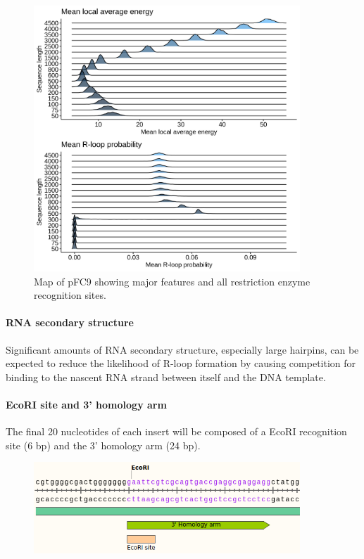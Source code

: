 \documentclass[11pt]{article}
\begin{document}
\begin{figure}[H]
	\includegraphics[width=10cm]{images/plots/rand_seq_LAE_dist.png}
	\centering
	\caption{Map of pFC9 showing major features and all restriction enzyme recognition sites.}
	\label{fig:pFC9}
\end{figure}

\paragraph{RNA secondary structure}

Significant amounts of RNA secondary structure, especially large hairpins, can be expected to reduce the likelihood of R-loop formation by causing competition for binding to the nascent RNA strand between itself and the DNA template. 


\paragraph{EcoRI site and 3' homology arm}

The final 20 nucleotides of each insert will be composed of a EcoRI recognition site (6 bp) and the 3' homology arm (24 bp). 

\begin{figure}[H]
	\includegraphics[width=10cm]{images/variable_region/3_homology_arm.png}
	\centering
	\caption{}
	\label{fig:pFC9}
\end{figure}
\end{document}

